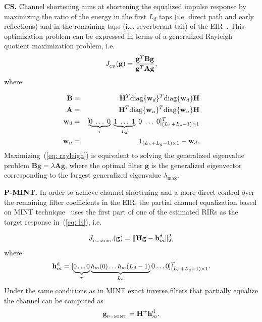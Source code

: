 \documentclass{article}
\begin{document}
\smallskip \noindent \textbf{CS.} \enspace Channel shortening aims at shortening the equalized impulse response by maximizing the ratio of the energy in the first $L_d$ taps (i.e. direct path and early reflections) and in the remaining taps (i.e. reverberant tail) of the EIR~\cite{Kallinger_ICASSP_2006}. 
This optimization problem can be expressed in terms of a generalized Rayleigh quotient maximization problem, i.e.
\begin{equation}
\label{eq: rayleigh}
J_{{}_{\rm CS}}(\mathbf{g})= \frac{\mathbf{g}^T {\mathbf{B}} \mathbf{g}}{\mathbf{g}^T {\mathbf{A}} \mathbf{g}},
\end{equation}
where

\begin{eqnarray}
\label{eq: wincs}
{\mathbf{B}} & = & {\mathbf{H}}^{T} {\rm diag}\{\mathbf{w}_d \}^T {\rm diag}\{\mathbf{w}_d \}{\mathbf{H}}  \\
{\mathbf{A}} & = & {\mathbf{H}}^{T} {\rm diag}\{\mathbf{w}_u \}^T {\rm diag}\{\mathbf{w}_u \}{\mathbf{H}}  \\
\mathbf{w}_d & = & [\underbrace{0 \; \ldots \; 0}_{\tau} \; \underbrace{1 \; \ldots \; 1}_{L_{d}}\; 0\; \ldots\; 0]_{(L_h+L_g-1) \times 1}^{T}  \\
\mathbf{w}_u & = & \mathbf{1}_{(L_h+L_g-1)\times 1} - \mathbf{w}_d.
\end{eqnarray}
Maximizing~(\ref{eq: rayleigh}) is equivalent to solving the generalized eigenvalue problem $\mathbf{B} \mathbf{g} = \lambda \mathbf{A} \mathbf{g}$, where the optimal filter $\mathbf{g}$ is the generalized eigenvector corresponding to the largest generalized eigenvalue $\lambda_{\max}$.

\smallskip \noindent \textbf{P-MINT.} \enspace In order to achieve channel shortening and a more direct control over the remaining filter coefficients in the EIR, the partial channel equalization based on MINT technique~\cite{Kodrasi_ICASSP_2012} uses the first part of one of the estimated RIRs as the target response in~(\ref{eq: ls}), i.e.  

\begin{equation}
  J_{{}_{\rm P-MINT}}(\mathbf{g}) = \|{\mathbf{H}}\mathbf{g} - {\mathbf{h}}_m^{\rm d}\|_2^2,
\end{equation}
where   
\begin{equation}
\small
\mathbf{h}_{m}^{\rm d} = [\underbrace{0\phantom{\rlap{$(L_d-1)$}} \ldots 0 }_{\tau} \underbrace{h_m(0) \ldots h_m(L_d-1)}_{L_d} 0 \ldots 0 ]_{(L_h+L_g-1) \times 1}^{T}.
\end{equation}
Under the same conditions as in MINT exact inverse filters that partially equalize the channel can be computed as
\begin{equation}  
\label{eq: Pmintsol}  
\mathbf{g}_{{}_{\rm P-MINT}} = {\mathbf{H}}^{+}{\mathbf{h}}_m^{\rm d}.
\end{equation}  
\end{document}
